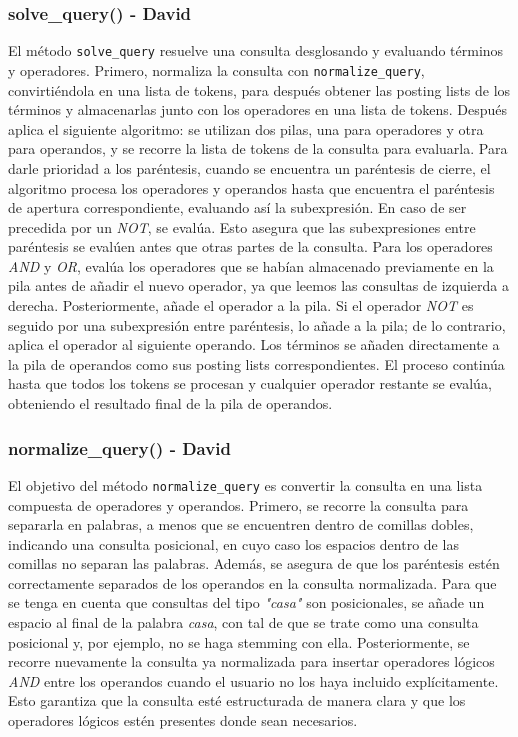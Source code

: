 \documentclass[12pt,a4paper]{article}
\begin{document}
\subsubsection{solve\_query() - David}
El método \texttt{solve\_query} resuelve una consulta desglosando y evaluando términos y operadores. Primero, normaliza la consulta con \texttt{normalize\_query}, convirtiéndola en una lista de tokens, para después obtener las posting lists de los términos y almacenarlas junto con los operadores en una lista de tokens.
Después aplica el siguiente algoritmo: se utilizan dos pilas, una para operadores y otra para operandos, y se recorre la lista de tokens de la consulta para evaluarla. Para darle prioridad a los paréntesis, cuando se encuentra un paréntesis de cierre, el algoritmo procesa los operadores y operandos hasta que encuentra el paréntesis de apertura correspondiente, evaluando así la subexpresión. En caso de ser precedida por un \textit{NOT}, se evalúa. Esto asegura que las subexpresiones entre paréntesis se evalúen antes que otras partes de la consulta. Para los operadores \textit{AND} y \textit{OR}, evalúa los operadores que se habían almacenado previamente en la pila antes de añadir el nuevo operador, ya que leemos las consultas de izquierda a derecha. Posteriormente, añade el operador a la pila. Si el operador \textit{NOT} es seguido por una subexpresión entre paréntesis, lo añade a la pila; de lo contrario, aplica el operador al siguiente operando. Los términos se añaden directamente a la pila de operandos como sus posting lists correspondientes. El proceso continúa hasta que todos los tokens se procesan y cualquier operador restante se evalúa, obteniendo el resultado final de la pila de operandos.

\subsubsection{normalize\_query() - David}
El objetivo del método \texttt{normalize\_query} es convertir la consulta en una lista compuesta de operadores y operandos. Primero, se recorre la consulta para separarla en palabras, a menos que se encuentren dentro de comillas dobles, indicando una consulta posicional, en cuyo caso los espacios dentro de las comillas no separan las palabras. Además, se asegura de que los paréntesis estén correctamente separados de los operandos en la consulta normalizada. Para que se tenga en cuenta que consultas del tipo \textit{"casa"} son posicionales, se añade un espacio al final de la palabra \textit{casa}, con tal de que se trate como una consulta posicional y, por ejemplo, no se haga stemming con ella. Posteriormente, se recorre nuevamente la consulta ya normalizada para insertar operadores lógicos \textit{AND} entre los operandos cuando el usuario no los haya incluido explícitamente. Esto garantiza que la consulta esté estructurada de manera clara y que los operadores lógicos estén presentes donde sean necesarios.
\end{document}
